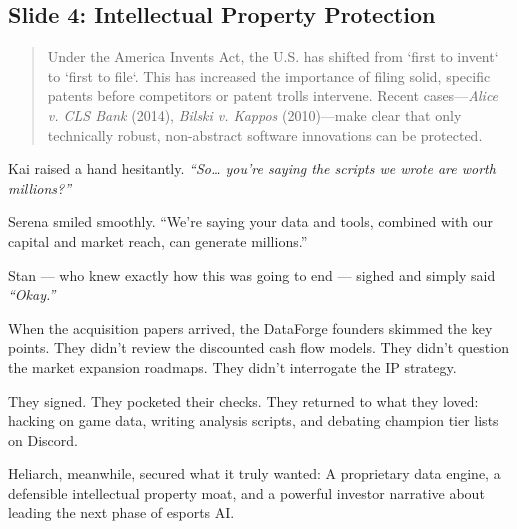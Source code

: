 \subsection{Slide 4: Intellectual Property Protection} 

\begin{quote}
    Under the America Invents Act, the U.S. has shifted from `first to invent` to `first to file`. This has increased the importance of filing solid, specific patents before competitors or patent trolls intervene. Recent cases—\textit{Alice v. CLS Bank} (2014), \textit{Bilski v. Kappos} (2010)—make clear that only technically robust, non-abstract software innovations can be protected.
\end{quote}

Kai raised a hand hesitantly.  
\textit{``So… you’re saying the scripts we wrote are worth millions?''}

Serena smiled smoothly.  
``We’re saying your data and tools, combined with our capital and market reach, can generate millions.''

Stan --- who knew exactly how this was going to end --- sighed and simply said  \textit{``Okay.''}

When the acquisition papers arrived, the DataForge founders skimmed the key points. They didn’t review the discounted cash flow models. They didn’t question the market expansion roadmaps. They didn’t interrogate the IP strategy.

They signed.  
They pocketed their checks.  
They returned to what they loved: hacking on game data, writing analysis scripts, and debating champion tier lists on Discord.

Heliarch, meanwhile, secured what it truly wanted:  
A proprietary data engine, a defensible intellectual property moat, and a powerful investor narrative about leading the next phase of esports AI.

\medskip

